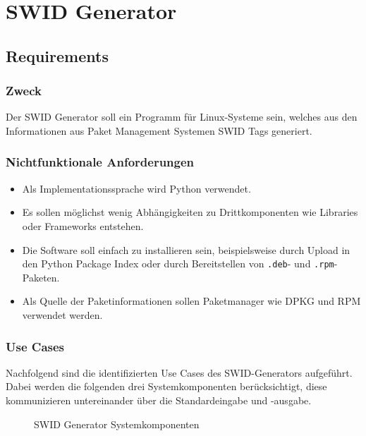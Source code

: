 \chapter{SWID Generator}


\section{Requirements}

\subsection{Zweck}

Der SWID Generator soll ein Programm für Linux-Systeme sein, welches aus den
Informationen aus Paket Management Systemen SWID Tags generiert.

\subsection{Nichtfunktionale Anforderungen}

\begin{itemize}
	\item Als Implementationssprache wird Python verwendet.
	\item Es sollen möglichst wenig Abhängigkeiten zu Drittkomponenten wie
		Libraries oder Frameworks entstehen.
	\item Die Software soll einfach zu installieren sein, beispielsweise durch
		Upload in den Python Package Index oder durch Bereitstellen von \texttt{.deb}- und
		\texttt{.rpm}-Paketen.
	\item Als Quelle der Paketinformationen sollen Paketmanager wie DPKG und RPM
		verwendet werden.
\end{itemize}

\subsection{Use Cases}

Nachfolgend sind die identifizierten Use Cases des SWID-Generators aufgeführt.
Dabei werden die folgenden drei Systemkomponenten berücksichtigt, diese
kommunizieren untereinander über die Standardeingabe und -ausgabe.

\vspace{1em}

\begin{figure}[H]
	\centering
	
	\caption{SWID Generator Systemkomponenten}
	\label{img:swid-generator-aktoren}
\end{figure}

